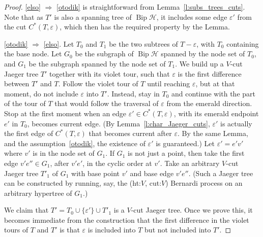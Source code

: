 \documentclass[10pt]{amsart}
\theoremstyle{definition}\newtheorem{defi}[theo]{Definition}
\theoremstyle{remark}\newtheorem{rema}[theo]{Remark}
\newcommand{\HH}{\mathcal H}
\DeclareMathOperator{\bip}{Bip}
\begin{document}
\begin{proof}
 \ref{elso} $\Rightarrow$ \ref{otodik} is straightforward from Lemma~\ref{l:subs_trees_cuts}. Note that as $T'$ is also a spanning tree of $\bip \HH$, it includes some edge $\varepsilon'$ from the cut $C^*(T,\varepsilon)$, which then has the required property by the Lemma. 


\ref{otodik} $\Rightarrow$ \ref{elso}. Let $T_0$ and $T_1$ be the two subtrees of $T-\varepsilon$, with $T_0$ containing the base node. Let $G_0$ be the subgraph of $\bip\HH$ spanned by the node set of $T_0$, and $G_1$ be the subgraph spanned by the node set of $T_1$. We build up a $V$-cut Jaeger tree $T'$ together with its violet tour, such that $\varepsilon$ is the first difference between $T'$ and $T$. Follow the violet tour of $T$ until reaching $\varepsilon$, but at that moment, do not include $\varepsilon$ into $T'$. Instead, stay in $T_0$ and continue with the part of the tour of $T$ that would follow the traversal of $\varepsilon$ from the emerald direction. Stop at the first moment when an edge $\varepsilon' \in C^*(T,\varepsilon)$, with its emerald endpoint $e'$ in $T_0$, becomes current edge. (By Lemma~\ref{l:char_Jaeger_cuts}, $\varepsilon'$ is actually the first edge of $C^*(T,\varepsilon)$ that becomes current after $\varepsilon$. By the same Lemma, and the assumption~\ref{otodik}, the existence of $\varepsilon'$ is guaranteed.) Let $\varepsilon'=e'v'$ where $v'$ is in the node set of $G_1$. If $G_1$ is not just a point, then take the first edge $v'e''\in G_1$, after $v'e'$, in the cyclic order at $v'$. Take an arbitrary $V$-cut Jaeger tree $T'_1$ of $G_1$ with base point $v'$ and base edge $v'e''$. (Such a Jaeger tree can be constructed by running, say, the (ht:$V$, cut:$V$) Bernardi process on an arbitrary hypertree of $G_1$.)

We claim that $T'=T_0\cup\{\varepsilon'\}\cup T'_1$ is a $V$-cut Jaeger tree. Once we prove this, it becomes immediate from the construction that the first difference in the violet tours of $T$ and $T'$ is that $\varepsilon$ is included into $T$ but not included into $T'$.


\end{proof}
\end{document}
